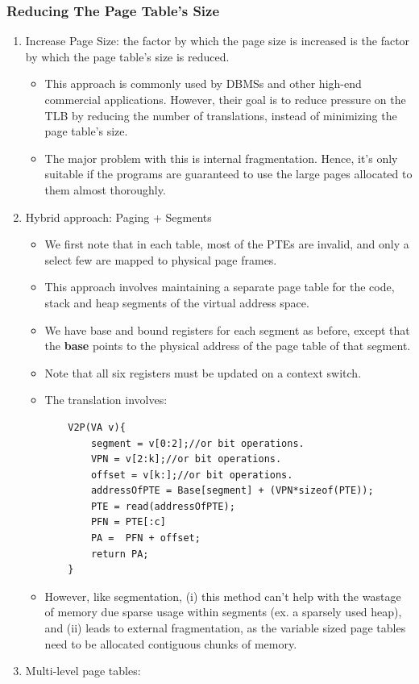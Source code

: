 \documentclass[10pt]{report}
\begin{document}
\subsubsection{Reducing The Page Table's Size}
\begin{enumerate}
\item Increase Page Size: the factor by which the page size is increased is the factor by which the page table's size is reduced.
\begin{itemize}
\item This approach is commonly used by DBMSs and other high-end
commercial applications. However, their goal is to reduce pressure
on the TLB by reducing the number of translations, instead of minimizing the page table's size.
\item The major problem with this is internal fragmentation. Hence, it's only suitable if the programs are guaranteed to use the
large pages allocated to them almost thoroughly.
\end{itemize}
\item  Hybrid approach: Paging + Segments
\begin{itemize}
    \item We first note that in each table, most of the PTEs are 
    invalid, and only a select few are mapped to physical page 
    frames.
    \item This approach involves maintaining a separate page table
    for the code, stack and heap segments of the virtual address 
    space.
    \item We have base and bound registers for each segment as before, except that the \textbf{base}
    points to the physical address of the page table of that segment.
    \item Note that all six registers must be updated on a context
    switch.
    \item The translation involves:
    \begin{lstlisting}
    V2P(VA v){
        segment = v[0:2];//or bit operations.
        VPN = v[2:k];//or bit operations.
        offset = v[k:];//or bit operations.
        addressOfPTE = Base[segment] + (VPN*sizeof(PTE));
        PTE = read(addressOfPTE);
        PFN = PTE[:c]
        PA =  PFN + offset;
        return PA;
    }
    \end{lstlisting}
    \item However, like segmentation, (i) this method can't help 
    with 
    the wastage of memory due sparse usage within segments (ex. a 
    sparsely used heap), and (ii) leads to external fragmentation, 
    as the variable sized page tables need to be allocated 
    contiguous chunks of memory.
\end{itemize}
\item Multi-level page tables:
\end{enumerate}
\end{document}
